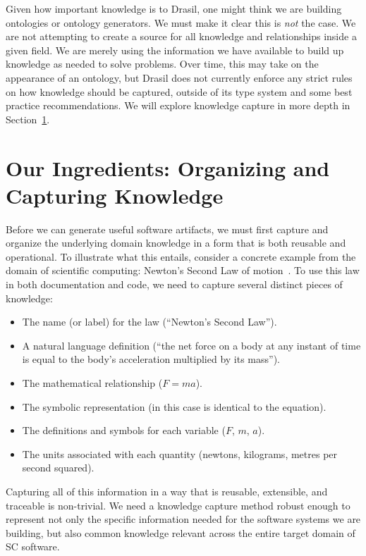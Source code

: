 Given how important knowledge is to Drasil, one might think we are building 
ontologies or ontology generators. We must make it clear this is \emph{not} the 
case. We are not attempting to create a source for all knowledge and 
relationships inside a given field. We are merely using the information we have 
available to build up knowledge as needed to solve problems. Over time, this 
may take on the appearance of an ontology, but Drasil does not currently 
enforce any strict rules on how knowledge should be captured, outside of its 
type system and some best practice recommendations. We will explore knowledge 
capture in more depth in Section~\ref{sec:kc}.

\section{Our Ingredients: Organizing and Capturing Knowledge}
\label{sec:kc}

Before we can generate useful software artifacts, we must first capture and 
organize the underlying domain knowledge in a form that is both reusable and 
operational. To illustrate what this entails, consider a concrete example from 
the domain of scientific computing: Newton's Second Law of 
motion~\citep{Newton1687}. To use this law in both documentation and code, we
need to capture several distinct pieces of knowledge:

\begin{itemize}
    \item The name (or label) for the law (``Newton's Second Law'').
    \item A natural language definition (``the net force on a body at any 
    instant of time is equal to the body's acceleration multiplied by its 
    mass'').
    \item The mathematical relationship ($F = ma$).
    \item The symbolic representation (in this case is identical to the 
    equation).
    \item The definitions and symbols for each variable ($F$, $m$, $a$).
    \item The units associated with each quantity (newtons, kilograms, metres 
    per second squared).
\end{itemize}

Capturing all of this information in a way that is reusable, extensible, and 
traceable is non-trivial. We need a knowledge capture method robust enough to 
represent not only the specific information needed for the software systems we 
are building, but also common knowledge relevant across the entire target 
domain of SC software.

